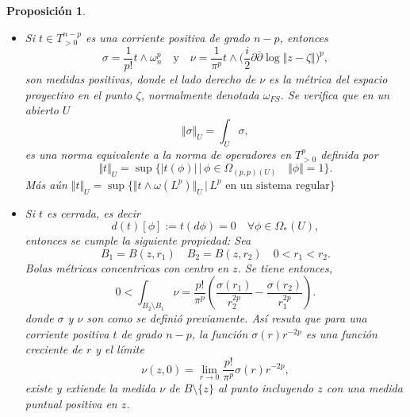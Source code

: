 \documentclass[letterpaper]{article}
\newtheorem{prop}[teorema]{Proposici\'on}
\begin{document}
\begin{prop}
\begin{itemize}
        \item[4] Si $t\in T^{n-p}_{>0}$ es una corriente positiva de grado $n-p$, entonces
        \[
            \sigma=\frac{1}{p!}t\wedge\omega_n^{p}
            \quad\text{y}\quad
            \nu=\frac{1}{\pi^p}t\wedge\Big(\frac{i}{2}\partial\overline{\partial}\log\Vert z-\zeta\Vert\Big)^{p},
        \]
        son medidas positivas, donde el lado derecho de $\nu$ es la métrica del espacio proyectivo en el punto $\zeta$, normalmente denotada $\omega_{FS}$. Se verifica que en un abierto $U$
        \[
            \Vert\sigma\Vert_{U}=\int_{U}\sigma,
        \]
        es una norma equivalente a la norma de operadores en $T^p_{>0}$ definida por
        \[
            \Vert t\Vert_U=\sup\{|t(\phi)|\,\vert\,\phi\in \Omega_{(p,p)(U)}\quad\Vert\phi\Vert=1\}.
        \]
        Más aún $\Vert t\Vert_U=\sup\{\Vert t\wedge\omega(L^{p})\Vert_U\,\vert\,L^{p}\text{ en un sistema regular}\}$
        \item[5] Si $t$ es cerrada, es decir
        \[
            d(t)[\phi]:=t(d\phi)=0\quad\forall\phi\in\Omega_{*}(U),
        \]
        entonces se cumple la siguiente propiedad: Sea
        \[
            B_1=B(z,r_1)\quad B_2=B(z,r_2)\quad 0<r_1<r_2.
        \]
        Bolas métricas concentricas con centro en $z$. Se tiene entonces,
        \[
            0<\int_{B_2\setminus B_1}\nu= \frac{p!}{\pi^{p}}(\frac{\sigma(r_1)}{r^{2p}_2}-\frac{\sigma(r_2)}{r^{2p}_1}).
        \]
        donde $\sigma$ y $\nu$ son como se definió previamente. Así resuta que para una corriente positiva $t$ de grado $n-p$, la función $\sigma(r)r^{-2p}$ es una función creciente de $r$ y el límite
        \[
            \nu(z,0)=\lim_{r\rightarrow 0}\frac{p!}{\pi^{p}}\sigma(r)r^{-2p},
        \]
        existe y extiende la medida $\nu$ de $B\setminus\{z\}$ al punto incluyendo $z$ con una medida puntual positiva en $z$.
    \end{itemize}
\end{prop}
\end{document}
